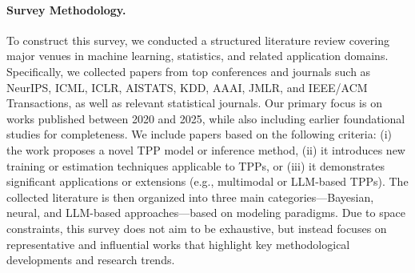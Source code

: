 \documentclass[10pt]{article} %
\begin{document}
\paragraph{Survey Methodology.}
To construct this survey, we conducted a structured literature review covering major venues in machine learning, statistics, and related application domains. Specifically, we collected papers from top conferences and journals such as NeurIPS, ICML, ICLR, AISTATS, KDD, AAAI, JMLR, and IEEE/ACM Transactions, as well as relevant statistical journals. Our primary focus is on works published between 2020 and 2025, while also including earlier foundational studies for completeness. 
We include papers based on the following criteria: (i) the work proposes a novel TPP model or inference method, (ii) it introduces new training or estimation techniques applicable to TPPs, or (iii) it demonstrates significant applications or extensions (e.g., multimodal or LLM-based TPPs). The collected literature is then organized into three main categories—Bayesian, neural, and LLM-based approaches—based on modeling paradigms. 
Due to space constraints, this survey does not aim to be exhaustive, but instead focuses on representative and influential works that highlight key methodological developments and research trends. 


\begin{table}[!htbp]
    \caption{Survey comparison.}
    \label{table1}
    \centering
\end{table}



\end{document}
